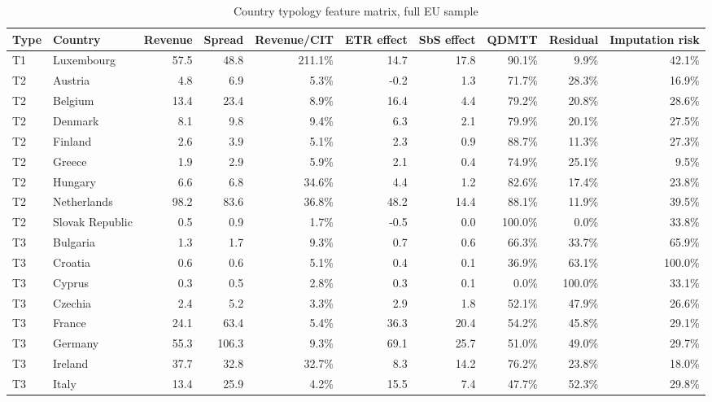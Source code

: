 \begin{table}[H]
\centering
\footnotesize
\setlength{\tabcolsep}{3pt}
\caption{Country typology feature matrix, full EU sample}
\label{tab:app_country_typology_features}
\begin{adjustbox}{max width=\textwidth,center}
\begin{tabular}{@{}llrrrrrrrr@{}}
\toprule
Type & Country & Revenue & Spread & Revenue/CIT & ETR effect & SbS effect & QDMTT & Residual & Imputation risk \\
\midrule
T1 & Luxembourg & 57.5 &  48.8 & 211.1\% & 14.7 & 17.8 &  90.1\% &   9.9\% &  42.1\% \\
T2 & Austria &  4.8 &   6.9 &   5.3\% & -0.2 &  1.3 &  71.7\% &  28.3\% &  16.9\% \\
T2 & Belgium & 13.4 &  23.4 &   8.9\% & 16.4 &  4.4 &  79.2\% &  20.8\% &  28.6\% \\
T2 & Denmark &  8.1 &   9.8 &   9.4\% &  6.3 &  2.1 &  79.9\% &  20.1\% &  27.5\% \\
T2 & Finland &  2.6 &   3.9 &   5.1\% &  2.3 &  0.9 &  88.7\% &  11.3\% &  27.3\% \\
T2 & Greece &  1.9 &   2.9 &   5.9\% &  2.1 &  0.4 &  74.9\% &  25.1\% &   9.5\% \\
T2 & Hungary &  6.6 &   6.8 &  34.6\% &  4.4 &  1.2 &  82.6\% &  17.4\% &  23.8\% \\
T2 & Netherlands & 98.2 &  83.6 &  36.8\% & 48.2 & 14.4 &  88.1\% &  11.9\% &  39.5\% \\
T2 & Slovak Republic &  0.5 &   0.9 &   1.7\% & -0.5 &  0.0 & 100.0\% &   0.0\% &  33.8\% \\
T3 & Bulgaria &  1.3 &   1.7 &   9.3\% &  0.7 &  0.6 &  66.3\% &  33.7\% &  65.9\% \\
T3 & Croatia &  0.6 &   0.6 &   5.1\% &  0.4 &  0.1 &  36.9\% &  63.1\% & 100.0\% \\
T3 & Cyprus &  0.3 &   0.5 &   2.8\% &  0.3 &  0.1 &   0.0\% & 100.0\% &  33.1\% \\
T3 & Czechia &  2.4 &   5.2 &   3.3\% &  2.9 &  1.8 &  52.1\% &  47.9\% &  26.6\% \\
T3 & France & 24.1 &  63.4 &   5.4\% & 36.3 & 20.4 &  54.2\% &  45.8\% &  29.1\% \\
T3 & Germany & 55.3 & 106.3 &   9.3\% & 69.1 & 25.7 &  51.0\% &  49.0\% &  29.7\% \\
T3 & Ireland & 37.7 &  32.8 &  32.7\% &  8.3 & 14.2 &  76.2\% &  23.8\% &  18.0\% \\
T3 & Italy & 13.4 &  25.9 &   4.2\% & 15.5 &  7.4 &  47.7\% &  52.3\% &  29.8\% \\

\end{tabular}
\end{adjustbox}
\end{table}
